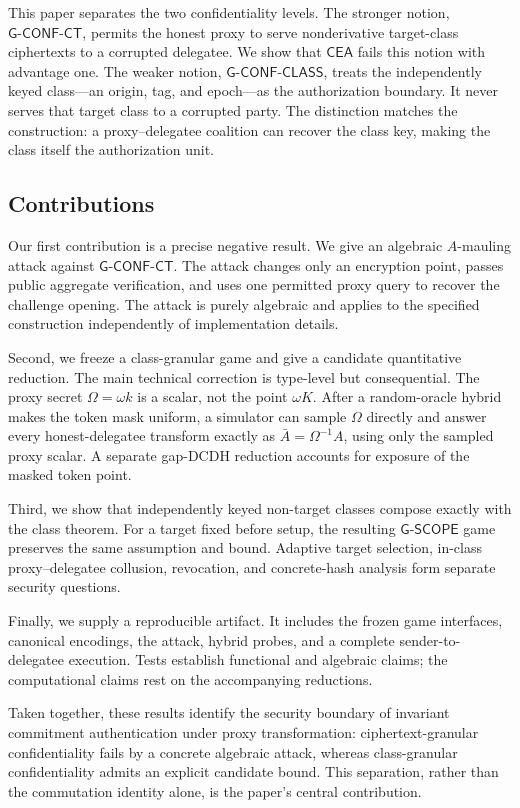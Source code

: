 \documentclass[11pt,letterpaper]{article}
\theoremstyle{definition}
\theoremstyle{remark}
\newcommand{\CEA}{\ensuremath{\mathsf{CEA}}\xspace}
\newcommand{\GClass}{\ensuremath{\mathsf{G\text{-}CONF\text{-}CLASS}}\xspace}
\newcommand{\GCT}{\ensuremath{\mathsf{G\text{-}CONF\text{-}CT}}\xspace}
\newcommand{\GScope}{\ensuremath{\mathsf{G\text{-}SCOPE}}\xspace}
\begin{document}
This paper separates the two confidentiality levels.  The stronger notion,
\GCT, permits the honest proxy to serve nonderivative target-class ciphertexts to
a corrupted delegatee.  We show that \CEA fails this notion with advantage one.
The weaker notion, \GClass, treats the independently keyed class---an origin,
tag, and epoch---as the authorization boundary.  It never serves that target
class to a corrupted party.  The distinction matches the construction: a
proxy--delegatee coalition can recover the class key, making the class itself the
authorization unit.

\subsection{Contributions}

Our first contribution is a precise negative result.  We give an algebraic
\(A\)-mauling attack against \GCT.  The attack changes only an encryption point,
passes public aggregate verification, and uses one permitted proxy query to
recover the challenge opening.  The attack is purely algebraic and applies to
the specified construction independently of implementation details.

Second, we freeze a class-granular game and give a candidate quantitative
reduction.  The main technical correction is type-level but consequential.  The
proxy secret \(\Omega=\omega k\) is a scalar, not the point \(\omega K\).  After a
random-oracle hybrid makes the token mask uniform, a simulator can sample
\(\Omega\) directly and answer every honest-delegatee transform exactly as
\(\bar A=\Omega^{-1}A\), using only the sampled proxy scalar.  A separate gap-DCDH
reduction accounts for exposure of the masked token point.

Third, we show that independently keyed non-target classes compose exactly with
the class theorem.  For a target fixed before setup, the resulting \GScope game
preserves the same assumption and bound.  Adaptive target selection,
in-class proxy--delegatee collusion, revocation, and concrete-hash analysis form
separate security questions.

Finally, we supply a reproducible artifact.  It includes the frozen game
interfaces, canonical encodings, the attack, hybrid probes, and a complete
sender-to-delegatee execution.  Tests establish functional and algebraic claims;
the computational claims rest on the accompanying reductions.

Taken together, these results identify the security boundary of invariant
commitment authentication under proxy transformation: ciphertext-granular
confidentiality fails by a concrete algebraic attack, whereas class-granular
confidentiality admits an explicit candidate bound.  This separation, rather
than the commutation identity alone, is the paper's central contribution.
\end{document}
